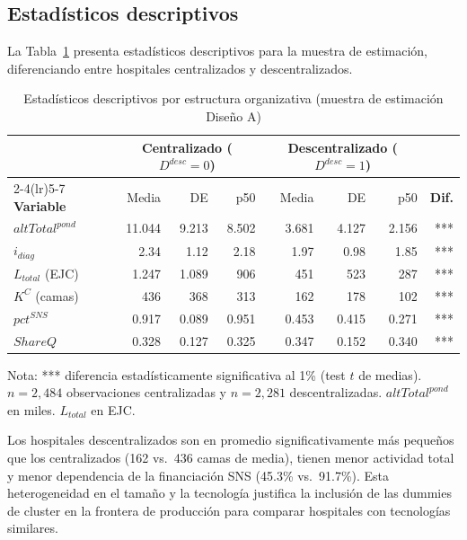 \documentclass[12pt, a4paper]{article}
\begin{document}
\subsection{Estadísticos descriptivos}

La Tabla~\ref{tab:descriptivos} presenta estadísticos
descriptivos para la muestra de estimación,
diferenciando entre hospitales centralizados y
descentralizados.

\begin{table}[h!]
\centering
\caption{Estadísticos descriptivos por estructura
organizativa (muestra de estimación Diseño A)}
\label{tab:descriptivos}
\begin{threeparttable}
\small
\begin{tabular}{lrrrrrrr}
\toprule
& \multicolumn{3}{c}{\textbf{Centralizado ($D^{desc}=0$)}}
& \multicolumn{3}{c}{\textbf{Descentralizado ($D^{desc}=1$)}} \\
\cmidrule(lr){2-4}\cmidrule(lr){5-7}
\textbf{Variable} & Media & DE & p50
  & Media & DE & p50 & \textbf{Dif.} \\
\midrule
$altTotal^{pond}$ & 11.044 & 9.213 & 8.502
  & 3.681 & 4.127 & 2.156 & *** \\
$i_{diag}$ & 2.34 & 1.12 & 2.18
  & 1.97 & 0.98 & 1.85 & *** \\
$L_{total}$ (EJC) & 1.247 & 1.089 & 906
  & 451 & 523 & 287 & *** \\
$K^C$ (camas) & 436 & 368 & 313
  & 162 & 178 & 102 & *** \\
$pct^{SNS}$ & 0.917 & 0.089 & 0.951
  & 0.453 & 0.415 & 0.271 & *** \\
$ShareQ$ & 0.328 & 0.127 & 0.325
  & 0.347 & 0.152 & 0.340 & *** \\
\bottomrule
\end{tabular}
\begin{tablenotes}
  \small
  \item Nota: *** diferencia estadísticamente
    significativa al 1\% (test $t$ de medias).
    $n = 2{,}484$ observaciones centralizadas y
    $n = 2{,}281$ descentralizadas.
    $altTotal^{pond}$ en miles.
    $L_{total}$ en EJC.
\end{tablenotes}
\end{threeparttable}
\end{table}

Los hospitales descentralizados son en promedio
significativamente más pequeños que los centralizados
(162 vs.\ 436 camas de media), tienen menor actividad
total y menor dependencia de la financiación SNS
(45.3\% vs.\ 91.7\%). Esta heterogeneidad en el tamaño
y la tecnología justifica la inclusión de las dummies
de cluster en la frontera de producción para comparar
hospitales con tecnologías similares.
\end{document}
